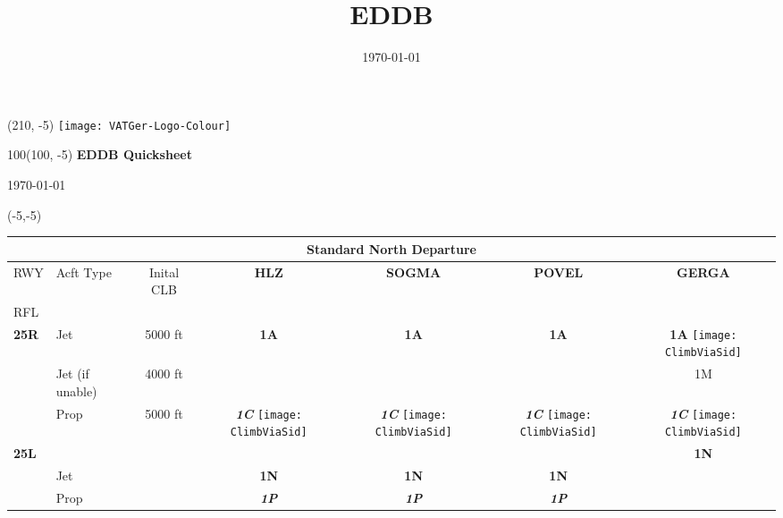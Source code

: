\documentclass[10pt,landscape,a4paper]{article}
\title{EDDB}
\author{ }
\date{\today}
\begin{document}
\setlength\extrarowheight{1pt}

\setlength{\TPHorizModule}{1mm}
\setlength{\TPVertModule}{\TPHorizModule}
\textblockorigin{7mm}{12mm}

\begin{textblock}{2}(210, -5)
  \texttt{[image: VATGer-Logo-Colour]}
\end{textblock}

\begin{textblock}{100}(100, -5)
  \large
  \centering
  \textbf{EDDB Quicksheet}

  \today
\end{textblock}


\begin{textblock}{30}(-5,-5)
\begin{table}
\begin{tabular}{|l|l|c|c|c|c|c|}
\multicolumn{7}{c}{\textbf{Standard North Departure}}  \\ \hline
RWY 			& Acft Type				& Inital CLB & \textbf{HLZ} & \textbf{SOGMA} & \textbf{POVEL} & \textbf{GERGA} \\
RFL 			& 						& 			& & & & \\		\hline	

\textbf{25R} & Jet & 5000 ft & \textbf{1A} & \textbf{1A} & \textbf{1A} & \textbf{1A} \texttt{[image: ClimbViaSid]}  \\ \cline{2-7}
& Jet (if unable) & 4000 ft & & & & 1M \\ \cline{2-7}
& Prop & \multirow{6}{*}{5000 ft} & \textbf{\textit{1C}} \texttt{[image: ClimbViaSid]} & \textbf{\textit{1C}} \texttt{[image: ClimbViaSid]} & \textbf{\textit{1C}}  \texttt{[image: ClimbViaSid]} & \textbf{\textit{1C}} \texttt{[image: ClimbViaSid]} \\ \cline{1-2} \cline{4-7}

\textbf{25L} & & & & & & \textbf{1N} \\ \cline{2-2} \cline{4-7}
& Jet & & \textbf{1N} & \textbf{1N} & \textbf{1N} & \\ \cline{2-2} \cline{4-7}
& Prop & & \textbf{\textit{1P}} & \textbf{\textit{1P}} & \textbf{\textit{1P}} & \\ \cline{1-2} \cline{4-7}


\end{tabular}
\end{table}
\end{textblock}
\end{document}
